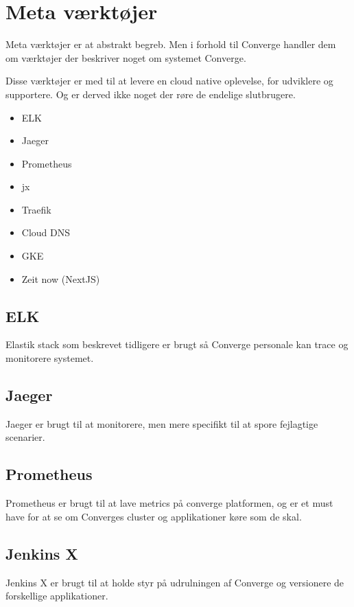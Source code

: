 \section{Meta værktøjer}

Meta værktøjer er at abstrakt begreb. Men i forhold til Converge handler dem om værktøjer der beskriver noget om systemet Converge.

Disse værktøjer er med til at levere en cloud native oplevelse, for udviklere og supportere. Og er derved ikke noget der røre de endelige slutbrugere.

\begin{itemize}
    \item ELK
    \item Jaeger
    \item Prometheus
    \item jx
    \item Traefik
    \item Cloud DNS
    \item GKE
    \item Zeit now (NextJS)
\end{itemize}

\subsection{ELK}

Elastik stack som beskrevet tidligere er brugt så Converge personale kan trace og monitorere systemet.

\subsection{Jaeger}

Jaeger er brugt til at monitorere, men mere specifikt til at spore fejlagtige scenarier.

\subsection{Prometheus}

Prometheus er brugt til at lave metrics på converge platformen, og er et must have for at se om Converges cluster og applikationer køre som de skal.

\subsection{Jenkins X}

Jenkins X er brugt til at holde styr på udrulningen af Converge og versionere de forskellige applikationer.

